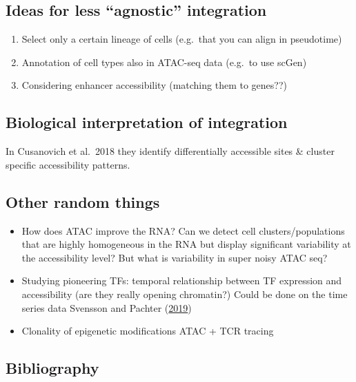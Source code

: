 \documentclass[]{article}
\providecommand{\tightlist}{%
  \setlength{\itemsep}{0pt}\setlength{\parskip}{0pt}}
\begin{document}
\hypertarget{ideas-for-less-agnostic-integration}{%
\subsection{Ideas for less ``agnostic''
integration}\label{ideas-for-less-agnostic-integration}}

\begin{enumerate}
\def\labelenumi{\arabic{enumi})}
\tightlist
\item
  Select only a certain lineage of cells (e.g.~that you can align in
  pseudotime)
\item
  Annotation of cell types also in ATAC-seq data (e.g.~to use scGen)
\item
  Considering enhancer accessibility (matching them to genes??)
\end{enumerate}

\hypertarget{biological-interpretation-of-integration}{%
\subsection{Biological interpretation of
integration}\label{biological-interpretation-of-integration}}

In Cusanovich et al.~2018 they identify differentially accessible sites
\& cluster specific accessibility patterns.

\hypertarget{other-random-things}{%
\subsection{Other random things}\label{other-random-things}}

\begin{itemize}
\tightlist
\item
  How does ATAC improve the RNA? Can we detect cell clusters/populations
  that are highly homogeneous in the RNA but display significant
  variability at the accessibility level? But what is variability in
  super noisy ATAC seq?
\item
  Studying pioneering TFs: temporal relationship between TF expression
  and accessibility (are they really opening chromatin?) Could be done
  on the time series data Svensson and Pachter
  (\protect\hyperlink{ref-svenssonInterpretableFactorModels2019}{2019})
\item
  Clonality of epigenetic modifications ATAC + TCR tracing
\end{itemize}

\hypertarget{bibliography}{%
\subsection*{Bibliography}\label{bibliography}}
\end{document}
